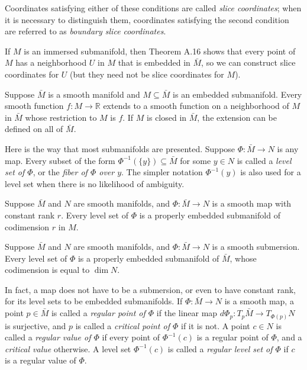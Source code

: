 Coordinates satisfying either of these conditions are called \emph{slice coordinates}; when it is necessary to distinguish them, coordinates satisfying the second condition are referred to as \emph{boundary slice coordinates}.

If $M$ is an immersed submanifold, then Theorem A.16 shows that every point of $M$ has a neighborhood $U$ in $M$ that is embedded in $\bar{M}$, so we can construct slice coordinates for $U$ (but they need not be slice coordinates for $M$).

\begin{proposition}
\label{prop:extension-smooth-function}
Suppose $\bar{M}$ is a smooth manifold and $M \subseteq \bar{M}$ is an
embedded submanifold. Every smooth function $f:M\to\mathbb{R}$ extends to a
smooth function on a neighborhood of $M$ in $\bar{M}$ whose restriction to
$M$ is $f$. If $M$ is closed in $\bar{M}$, the extension can be defined on all
of $\bar{M}$.
\end{proposition}

Here is the way that most submanifolds are presented. Suppose $\Phi: \bar{M} \to N$ is any map. Every subset of the form $\Phi^{-1}(\{y\}) \subseteq \bar{M}$ for some $y \in N$ is called a \emph{level set of $\Phi$}, or the \emph{fiber of $\Phi$ over $y$}. The simpler notation $\Phi^{-1}(y)$ is also used for a level set when there is no likelihood of ambiguity.

\begin{theorem}
\label{thm:constant-rank-level-set}
Suppose $\bar{M}$ and $N$ are smooth manifolds, and $\Phi: \bar{M} \to N$ is a smooth map with constant rank $r$. Every level set of $\Phi$ is a properly embedded submanifold of codimension $r$ in $M$.
\end{theorem}

\begin{corollary}
\label{cor:submersion-level-set}
Suppose $\bar{M}$ and $N$ are smooth manifolds, and $\Phi: \bar{M} \to N$ is a smooth submersion. Every level set of $\Phi$ is a properly embedded submanifold of $\bar{M}$, whose codimension is equal to $\dim N$.
\end{corollary}

In fact, a map does not have to be a submersion, or even to have constant rank, for its level sets to be embedded submanifolds. If $\Phi: \bar{M} \to N$ is a smooth map, a point $p \in \bar{M}$ is called a \emph{regular point of $\Phi$} if the linear map $d\Phi_p: T_p \bar{M} \to T_{\Phi(p)} N$ is surjective, and $p$ is called a \emph{critical point of $\Phi$} if it is not. A point $c \in N$ is called a \emph{regular value of $\Phi$} if every point of $\Phi^{-1}(c)$ is a regular point of $\Phi$, and a \emph{critical value} otherwise. A level set $\Phi^{-1}(c)$ is called a \emph{regular level set of $\Phi$} if $c$ is a regular value of $\Phi$.

